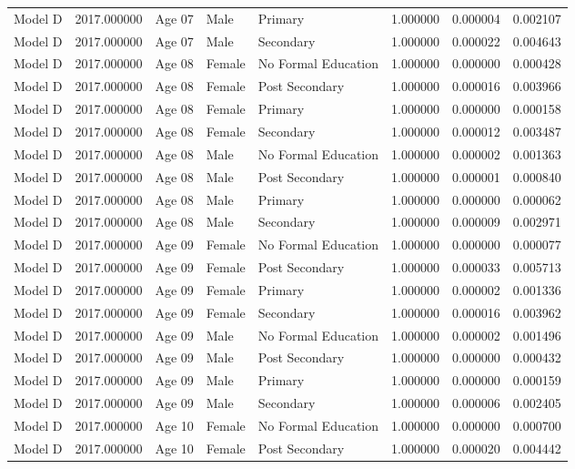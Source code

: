 \begin{table}[ht]
\begin{tabular}{lrlllrrr}
Model D & 2017.000000 & Age 07 & Male & Primary & 1.000000 & 0.000004 & 0.002107 \\
Model D & 2017.000000 & Age 07 & Male & Secondary & 1.000000 & 0.000022 & 0.004643 \\
Model D & 2017.000000 & Age 08 & Female & No Formal Education & 1.000000 & 0.000000 & 0.000428 \\
Model D & 2017.000000 & Age 08 & Female & Post Secondary & 1.000000 & 0.000016 & 0.003966 \\
Model D & 2017.000000 & Age 08 & Female & Primary & 1.000000 & 0.000000 & 0.000158 \\
Model D & 2017.000000 & Age 08 & Female & Secondary & 1.000000 & 0.000012 & 0.003487 \\
Model D & 2017.000000 & Age 08 & Male & No Formal Education & 1.000000 & 0.000002 & 0.001363 \\
Model D & 2017.000000 & Age 08 & Male & Post Secondary & 1.000000 & 0.000001 & 0.000840 \\
Model D & 2017.000000 & Age 08 & Male & Primary & 1.000000 & 0.000000 & 0.000062 \\
Model D & 2017.000000 & Age 08 & Male & Secondary & 1.000000 & 0.000009 & 0.002971 \\
Model D & 2017.000000 & Age 09 & Female & No Formal Education & 1.000000 & 0.000000 & 0.000077 \\
Model D & 2017.000000 & Age 09 & Female & Post Secondary & 1.000000 & 0.000033 & 0.005713 \\
Model D & 2017.000000 & Age 09 & Female & Primary & 1.000000 & 0.000002 & 0.001336 \\
Model D & 2017.000000 & Age 09 & Female & Secondary & 1.000000 & 0.000016 & 0.003962 \\
Model D & 2017.000000 & Age 09 & Male & No Formal Education & 1.000000 & 0.000002 & 0.001496 \\
Model D & 2017.000000 & Age 09 & Male & Post Secondary & 1.000000 & 0.000000 & 0.000432 \\
Model D & 2017.000000 & Age 09 & Male & Primary & 1.000000 & 0.000000 & 0.000159 \\
Model D & 2017.000000 & Age 09 & Male & Secondary & 1.000000 & 0.000006 & 0.002405 \\
Model D & 2017.000000 & Age 10 & Female & No Formal Education & 1.000000 & 0.000000 & 0.000700 \\
Model D & 2017.000000 & Age 10 & Female & Post Secondary & 1.000000 & 0.000020 & 0.004442 \\

\end{tabular}
\end{table}
